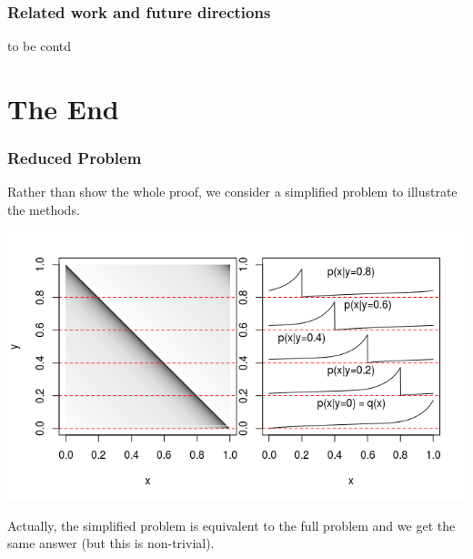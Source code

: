\documentclass{beamer}
\begin{document}
\begin{frame}
\frametitle{Related work and future directions}
to be contd
\end{frame}

\section{The End}

\begin{frame}
\sectionpage
\end{frame}


\begin{frame}
\frametitle{Reduced Problem}
Rather than show the whole proof, we consider a simplified problem to illustrate the methods.
\begin{center}
\includegraphics[scale = 0.5]{../diagram/qxplot.png}
\end{center}

Actually, the simplified problem is equivalent to the full problem and we get the same answer (but this is non-trivial).
\end{frame}
\end{document}
